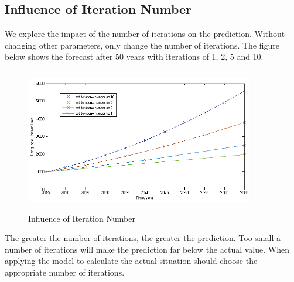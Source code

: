 \documentclass{mcmthesis}
\begin{document}



    \subsection{Influence of Iteration Number }%
    We explore the impact of the number of iterations on the prediction.
    Without changing other parameters, only change the number of iterations.
    The figure below shows the forecast after 50 years with iterations of 1, 2, 5 and 10.

    \begin{figure}[h]
      \centering
      \includegraphics[height=6.3cm,width=10cm]{p5.png}
      \caption{Influence of Iteration Number}
      \label{p5}
    \end{figure}

    The greater the number of iterations, the greater the prediction.
    Too small a number of iterations will make the prediction far below the actual value.
    When applying the model to calculate the actual situation should choose the appropriate number of iterations.


\end{document}
